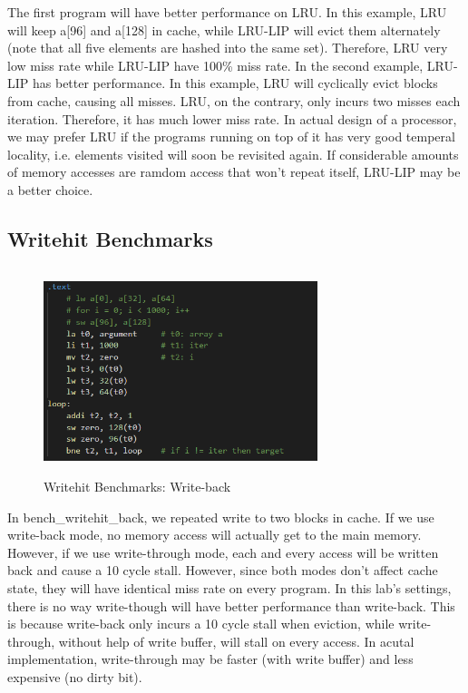 \documentclass[utf8]{article}
\begin{document}
The first program will have better performance on LRU. In this example, LRU will keep a[96] and a[128] in cache, while LRU-LIP will evict them alternately (note that all five elements are hashed into the same set). Therefore, LRU very low miss rate while LRU-LIP have 100\% miss rate. In the second example, LRU-LIP has better performance. In this example, LRU will cyclically evict blocks from cache, causing all misses. LRU, on the contrary, only incurs two misses each iteration. Therefore, it has much lower miss rate. In actual design of a processor, we may prefer LRU if the programs running on top of it has very good temperal locality, i.e. elements visited will soon be revisited again. If considerable amounts of memory accesses are ramdom access that won't repeat itself, LRU-LIP may be a better choice.

\newpage
{}


\subsection{Writehit Benchmarks}
\begin{figure}[h]
	\centering
	\includegraphics[width=8cm, height=6cm]{screenshot006}
	\caption{Writehit Benchmarks: Write-back}
	\label{fig:screenshot006}
\end{figure}

In bench\_writehit\_back, we repeated write to two blocks in cache. If we use write-back mode, no memory access will actually get to the main memory. However, if we use write-through mode, each and every access will be written back and cause a 10 cycle stall. However, since both modes don't affect cache state, they will have identical miss rate on every program. In this lab's settings, there is no way write-though will have better performance than write-back. This is because write-back only incurs a 10 cycle stall when eviction, while write-through, without help of write buffer, will stall on every access. In acutal implementation, write-through may be faster (with write buffer) and less expensive (no dirty bit).
\newline
\end{document}
